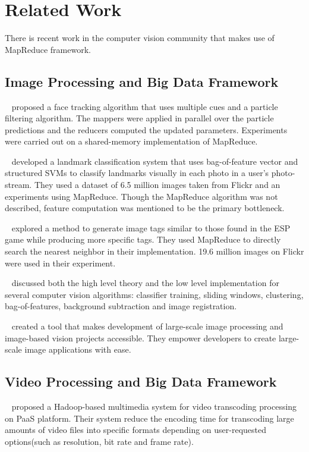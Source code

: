 \section{Related Work}
\label{sec:sec_background}

There is recent work in the computer vision community that makes use of
MapReduce framework. 

\subsection{Image Processing and Big Data Framework}
\citeauthor{2009_ICME_Liu}~\cite{2009_ICME_Liu} proposed a face tracking
algorithm that uses multiple cues and a particle filtering algorithm. The mappers were applied in parallel
over the particle predictions and the reducers computed the updated parameters.
Experiments were carried out on a shared-memory implementation of MapReduce. 

\citeauthor{2009_ICCV_Li}~\cite{2009_ICCV_Li} developed a landmark
classification system that uses bag-of-feature vector and structured SVMs to classify landmarks visually in
each photo in a user's photo-stream. They used a dataset of 6.5 million images
taken from Flickr and an experiments using MapReduce. Though the MapReduce
algorithm was not described, feature computation was mentioned to be the primary
bottleneck. 

\citeauthor{2009_WSMC_Kennedy}~\cite{2009_WSMC_Kennedy} explored a method to
generate image tags similar to those found in the ESP game while producing more specific tags. They used
MapReduce to directly search the nearest neighbor in their implementation. 19.6
million images on Flickr were used in their experiment. 

\citeauthor{2010_KDD_White}~\cite{2010_KDD_White} discussed both the high level
theory and the low level implementation for several computer vision algorithms:
classifier training, sliding windows, clustering, bag-of-features, background
subtraction and image registration. 

\citeauthor{2011_thesis_sweeney}~\cite{2011_thesis_sweeney} created a tool that
makes development of large-scale image processing and image-based vision projects
accessible. They empower developers to create large-scale image applications
with ease.

\subsection{Video Processing and Big Data Framework}
\citeauthor{2012_SMCCSE_Kim}~\cite{2012_SMCCSE_Kim} proposed a Hadoop-based
multimedia system for video transcoding processing on PaaS platform. Their
system reduce the encoding time for transcoding large amounts of video files
into specific formats depending on user-requested options(such as resolution,
bit rate and frame rate). 

